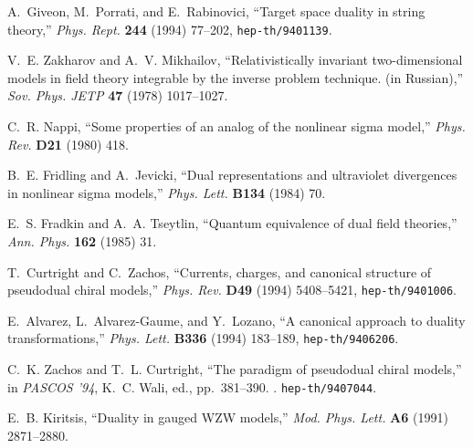 \documentclass[a4paper,12pt]{article}
\begin{document}
\providecommand{\href}[2]{#2}\begingroup\raggedright\begin{thebibliography}{10}

A.~Giveon, M.~Porrati, and E.~Rabinovici, ``Target space duality in string
  theory,'' {\em Phys. Rept.} {\bf 244} (1994) 77--202,
\href{http://www.arXiv.org/abs/hep-th/9401139}{{\tt hep-th/9401139}}.

V.~E. Zakharov and A.~V. Mikhailov, ``Relativistically invariant
  two-dimensional models in field theory integrable by the inverse problem
  technique. (in {Russian}),'' {\em Sov. Phys. JETP} {\bf 47} (1978)
1017--1027.

C.~R. Nappi, ``Some properties of an analog of the nonlinear sigma model,''
  {\em Phys. Rev.} {\bf D21} (1980)
418.

B.~E. Fridling and A.~Jevicki, ``Dual representations and ultraviolet
  divergences in nonlinear sigma models,'' {\em Phys. Lett.} {\bf B134} (1984)
70.

E.~S. Fradkin and A.~A. Tseytlin, ``Quantum equivalence of dual field
  theories,'' {\em Ann. Phys.} {\bf 162} (1985)
31.

T.~Curtright and C.~Zachos, ``Currents, charges, and canonical structure of
  pseudodual chiral models,'' {\em Phys. Rev.} {\bf D49} (1994) 5408--5421,
\href{http://www.arXiv.org/abs/hep-th/9401006}{{\tt hep-th/9401006}}.

E.~Alvarez, L.~Alvarez-Gaume, and Y.~Lozano, ``A canonical approach to duality
  transformations,'' {\em Phys. Lett.} {\bf B336} (1994) 183--189,
\href{http://www.arXiv.org/abs/hep-th/9406206}{{\tt hep-th/9406206}}.

C.~K. Zachos and T.~L. Curtright, ``The paradigm of pseudodual chiral models,''
  in {\em {PASCOS} '94}, K.~C. Wali, ed., pp.~381--390.
.
\newblock
\href{http://www.arXiv.org/abs/hep-th/9407044}{{\tt hep-th/9407044}}.
\newblock

E.~B. Kiritsis, ``Duality in gauged {WZW} models,'' {\em Mod. Phys. Lett.} {\bf
  A6} (1991)
2871--2880.


\end{thebibliography}
\end{document}
